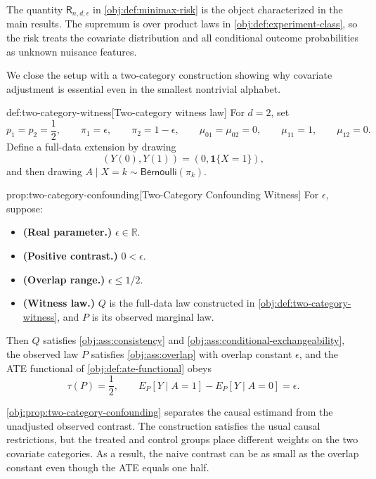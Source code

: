 The quantity \ensuremath{\mathsf R_{n,d,\epsilon}} in \cref{obj:def:minimax-risk} is the object characterized in the main results. The supremum is over product laws in \cref{obj:def:experiment-class}, so the risk treats the covariate distribution and all conditional outcome probabilities as unknown nuisance features.

We close the setup with a two-category construction showing why covariate adjustment is essential even in the smallest nontrivial alphabet.

\begin{definitionv}{def:two-category-witness}[Two-category witness law]
For \(d=2\), set
\[
p_1=p_2=\frac12,\qquad
\pi_1=\epsilon,\qquad
\pi_2=1-\epsilon,\qquad
\mu_{01}=\mu_{02}=0,\qquad
\mu_{11}=1,\qquad
\mu_{12}=0.
\]
Define a full-data extension by drawing
\[
(Y(0),Y(1))=(0,\mathbf 1\{X=1\}),
\]
and then drawing \(A\mid X=k\sim\mathsf{Bernoulli}(\pi_k)\).
\end{definitionv}

\begin{propositionv}{prop:two-category-confounding}[Two-Category Confounding Witness]
For \(\epsilon\), suppose:
\begin{itemize}
\item \textbf{(Real parameter.)} \(\epsilon\in\mathbb R\).
\item \textbf{(Positive contrast.)} \(0<\epsilon\).
\item \textbf{(Overlap range.)} \(\epsilon\le 1/2\).
\item \textbf{(Witness law.)} \(Q\) is the full-data law constructed in \cref{obj:def:two-category-witness}, and \(P\) is its observed marginal law.
\end{itemize}
Then \(Q\) satisfies \cref{obj:ass:consistency} and \cref{obj:ass:conditional-exchangeability}, the observed law \(P\) satisfies \cref{obj:ass:overlap} with overlap constant \(\epsilon\), and the ATE functional of \cref{obj:def:ate-functional} obeys
\[
\tau(P)=\frac12,
\qquad
E_P[Y\mid A=1]-E_P[Y\mid A=0]=\epsilon .
\]
\end{propositionv}

\cref{obj:prop:two-category-confounding} separates the causal estimand from the unadjusted observed contrast. The construction satisfies the usual causal restrictions, but the treated and control groups place different weights on the two covariate categories. As a result, the naive contrast can be as small as the overlap constant even though the ATE equals one half.
